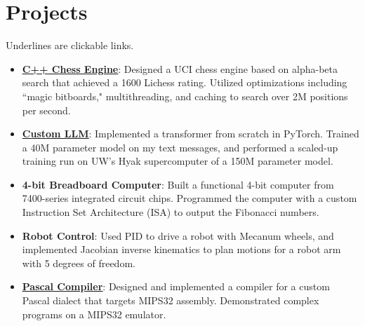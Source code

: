 \documentclass[letterpaper,12pt]{article}
\newcommand{\resumeItem}[2]{
  \item\small{
    \textbf{#1}{: #2 \vspace{-2pt}}
  }
}
\newcommand{\resumeSubItem}[2]{\resumeItem{#1}{#2}\vspace{-4pt}}
\newcommand{\resumeSubHeadingListStart}{\begin{itemize}[leftmargin=*]}
\newcommand{\resumeSubHeadingListEnd}{\end{itemize}}
\begin{document}
\section{Projects}
Underlines are clickable links.
  \resumeSubHeadingListStart
  \resumeSubItem{\href{https://github.com/ROTARTSI82/chess}{\underline{C++ Chess Engine}}}{Designed a UCI chess engine based on alpha-beta search that achieved a 1600 Lichess rating. Utilized optimizations including ``magic bitboards," multithreading, and caching to search over 2M positions per second.}
      \resumeSubItem{\href{https://github.com/ROTARTSI82/ATCS/tree/ATNeural/chessnn/llm}{\underline{Custom LLM}}}
      {Implemented a transformer from scratch in PyTorch. Trained a 40M parameter model on my text messages, and performed a scaled-up training run on UW's Hyak supercomputer of a 150M parameter model.}
    \resumeSubItem{4-bit Breadboard Computer}{Built a functional 4-bit computer from 7400-series integrated circuit chips. Programmed the computer with a custom Instruction Set Architecture (ISA) to output the Fibonacci numbers.}
    \resumeSubItem{Robot Control}{Used PID to drive a robot with Mecanum wheels, and implemented Jacobian inverse kinematics to plan motions for a robot arm with 5 degrees of freedom.}
    \resumeSubItem{\href{https://github.com/ROTARTSI82/ATCS/tree/ATCompilers}{\underline{Pascal Compiler}}}
      {Designed and implemented a compiler for a custom Pascal dialect that targets MIPS32 assembly. Demonstrated complex programs on a MIPS32 emulator.}
  \resumeSubHeadingListEnd



\end{document}

